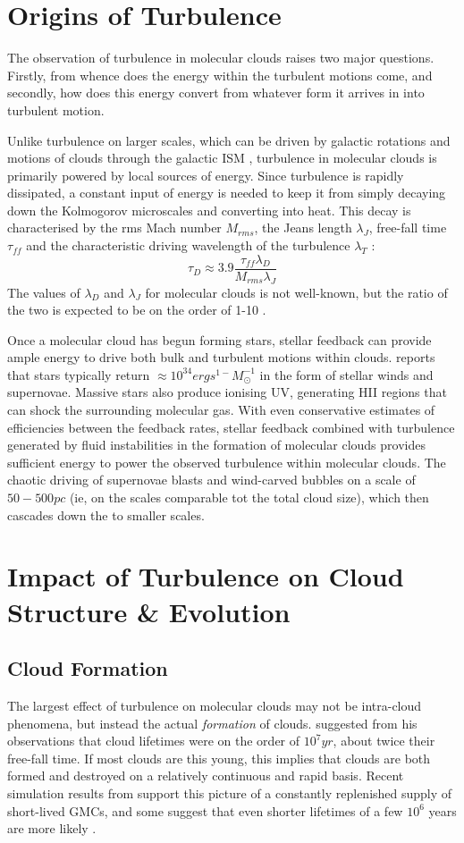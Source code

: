 \documentclass[12pt, preprint]{aastex}
\begin{document}
\section{Origins of Turbulence}
The observation of turbulence in molecular clouds raises two major questions.
Firstly, from whence does the energy within the turbulent motions come, and
secondly, how does this energy convert from whatever form it arrives in into 
turbulent motion.

Unlike turbulence on larger scales, which can be driven by galactic rotations
and motions of clouds through the galactic ISM \citep{balb1991}, turbulence in
molecular clouds is primarily powered by local sources of energy.  Since
turbulence is rapidly dissipated, a constant input of energy is needed to keep
it from simply decaying down the Kolmogorov microscales and converting into
heat.  This decay is characterised by the rms Mach number $M_{rms}$, the Jeans
length $\lambda_J$, free-fall time $\tau_{ff}$ and the characteristic driving 
wavelength of the turbulence $\lambda_T$ \citep{mac1999}:
$$ \tau_D \approx 3.9 \frac{\tau_{ff}\lambda_D}{M_{rms}\lambda_J}$$
The values of $\lambda_D$ and $\lambda_J$ for molecular clouds is not
well-known, but the ratio of the two is expected to be on the order of 1-10
\citep{mac2004}.

Once a molecular cloud has begun forming stars, stellar feedback can provide
ample energy to drive both bulk and turbulent motions within clouds.
\citet{agertz2012} reports that stars typically return 
$\approx 10^{34} erg s^{1-} M_\odot^{-1}$ in the form of stellar winds and
supernovae.  Massive stars also produce ionising UV, generating HII regions that
can shock the surrounding molecular gas.  With even conservative estimates of
efficiencies between the feedback rates, stellar feedback combined with
turbulence generated by fluid instabilities in the formation of molecular clouds
provides sufficient energy to power the observed turbulence within molecular
clouds\citep{elm2004}.  The chaotic driving of supernovae blasts and wind-carved
bubbles on a scale of $50-500pc$ (ie, on the scales comparable tot the total
cloud size), which then cascades down the to smaller scales.
\section{Impact of Turbulence on Cloud Structure \& Evolution}
\subsection{Cloud Formation}
The largest effect of turbulence on molecular clouds may not be intra-cloud
phenomena, but instead the actual \textit{formation} of clouds.
\citet{larson1981} suggested from his observations that cloud lifetimes were on
the order of $10^7 yr$, about twice their free-fall time.  If most clouds are
this young, this implies that clouds are both formed and destroyed on a
relatively continuous and rapid basis. Recent simulation results from
\citet{hopk2011} support this picture of a constantly replenished supply of
short-lived GMCs, and some suggest that even shorter lifetimes of a few $10^6$
years are more likely \cite{mac2004}.
\end{document}
